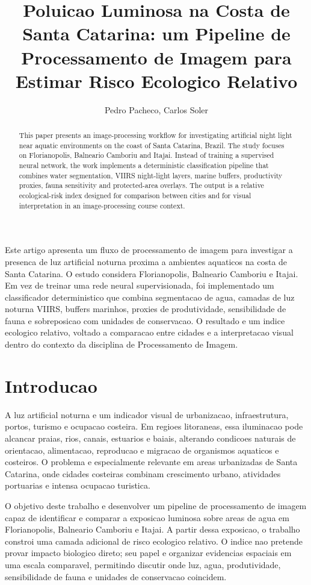 \documentclass[12pt]{article}
\title{Poluicao Luminosa na Costa de Santa Catarina: um Pipeline de Processamento de Imagem para Estimar Risco Ecologico Relativo}
\author{Pedro Pacheco\inst{1}, Carlos Soler\inst{1}}
\begin{document}
\maketitle

\begin{abstract}
This paper presents an image-processing workflow for investigating artificial night light near aquatic environments on the coast of Santa Catarina, Brazil. The study focuses on Florianopolis, Balneario Camboriu and Itajai. Instead of training a supervised neural network, the work implements a deterministic classification pipeline that combines water segmentation, VIIRS night-light layers, marine buffers, productivity proxies, fauna sensitivity and protected-area overlays. The output is a relative ecological-risk index designed for comparison between cities and for visual interpretation in an image-processing course context.
\end{abstract}

\begin{resumo}
Este artigo apresenta um fluxo de processamento de imagem para investigar a presenca de luz artificial noturna proxima a ambientes aquaticos na costa de Santa Catarina. O estudo considera Florianopolis, Balneario Camboriu e Itajai. Em vez de treinar uma rede neural supervisionada, foi implementado um classificador deterministico que combina segmentacao de agua, camadas de luz noturna VIIRS, buffers marinhos, proxies de produtividade, sensibilidade de fauna e sobreposicao com unidades de conservacao. O resultado e um indice ecologico relativo, voltado a comparacao entre cidades e a interpretacao visual dentro do contexto da disciplina de Processamento de Imagem.
\end{resumo}

\section{Introducao}

A luz artificial noturna e um indicador visual de urbanizacao, infraestrutura, portos, turismo e ocupacao costeira. Em regioes litoraneas, essa iluminacao pode alcancar praias, rios, canais, estuarios e baiais, alterando condicoes naturais de orientacao, alimentacao, reproducao e migracao de organismos aquaticos e costeiros. O problema e especialmente relevante em areas urbanizadas de Santa Catarina, onde cidades costeiras combinam crescimento urbano, atividades portuarias e intensa ocupacao turistica.

O objetivo deste trabalho e desenvolver um pipeline de processamento de imagem capaz de identificar e comparar a exposicao luminosa sobre areas de agua em Florianopolis, Balneario Camboriu e Itajai. A partir dessa exposicao, o trabalho constroi uma camada adicional de risco ecologico relativo. O indice nao pretende provar impacto biologico direto; seu papel e organizar evidencias espaciais em uma escala comparavel, permitindo discutir onde luz, agua, produtividade, sensibilidade de fauna e unidades de conservacao coincidem.
\end{document}
